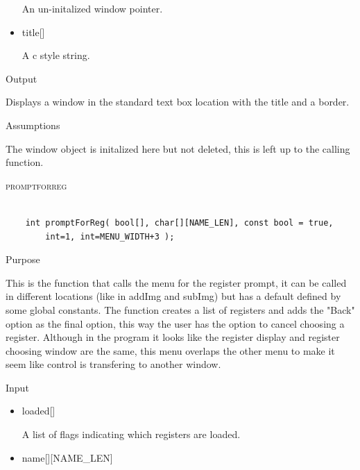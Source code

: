 \documentclass[pdftex, 11pt]{article}
\begin{document}
\begin{description}
\begin{description}
\begin{itemize}
						An un-initalized window pointer.

					\item{title[]}

						A c style string.

				\end{itemize}

			\item{Output}

				Displays a window in the standard text box location with
				the title and a border.

			\item{Assumptions}

				The window object is initalized here but not deleted, this
				is left up to the calling function.

		\end{description}



	\item{\textsc{promptforreg}}

		\begin{lstlisting}

	int promptForReg( bool[], char[][NAME_LEN], const bool = true, 
	    int=1, int=MENU_WIDTH+3 );
		\end{lstlisting}

		\begin{description}
			\item{Purpose}
				
				This is the function that calls the menu for the register prompt, it can be
				called in different locations (like in addImg and subImg) but has a default
				defined by some global constants.  The function creates a list of registers
				and adds the "Back" option as the final option, this way the user has the
				option to cancel choosing a register.  Although in the program it looks like
				the register display and register choosing window are the same, this menu
				overlaps the other menu to make it seem like control is transfering to another
				window.

			\item{Input}

				\begin{itemize}

					\item{loaded[]}

						A list of flags indicating which registers are loaded.

					\item{name[][NAME\_LEN]}


\end{itemize}
\end{description}
\end{description}
\end{document}
